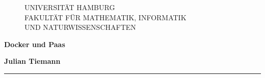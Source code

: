 \begin{titlepage}

  \setcounter{page}{-1}

	\begin{figure}[h]
		UNIVERSITÄT HAMBURG\\
    FAKULTÄT FÜR MATHEMATIK, INFORMATIK \\
    UND NATURWISSENSCHAFTEN

		\vspace{1cm}
	\end{figure}

	\vfill

	\begin{center}
		\vspace{14mm}
		\noindent \textbf{\huge
		  Docker und Paas \\
		}
		\vspace{60mm}
	\end{center}

	\vfill

	\noindent \textbf{Julian Tiemann} \\
	\noindent \rule{\textwidth}{0.4mm}
	 \\
	 \\
	 \\

	\newpage
	\thispagestyle{empty}
	\setcounter{page}{0}

\end{titlepage}

